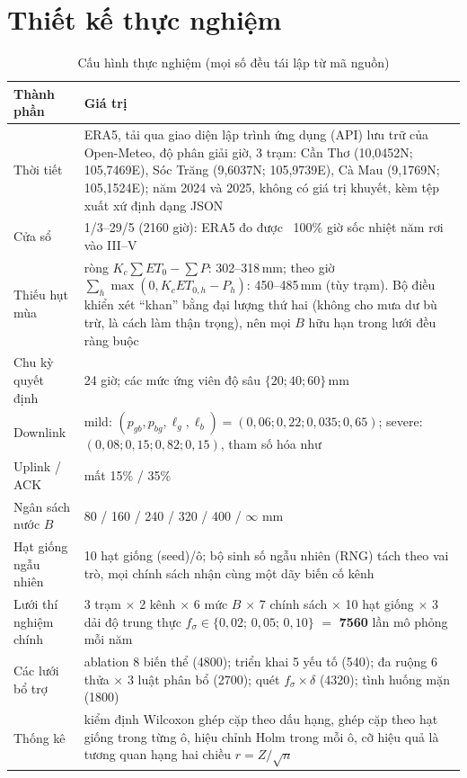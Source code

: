 \documentclass[10pt]{article}
\begin{document}
\section{Thiết kế thực nghiệm}

\begin{table}[h]
\centering
\caption{Cấu hình thực nghiệm (mọi số đều tái lập từ mã nguồn)}
\label{tab:setup}
\footnotesize
\begin{tabular}{@{}p{2.9cm}p{11.5cm}@{}}
\toprule
Thành phần & Giá trị \\
\midrule
Thời tiết & ERA5, tải qua giao diện lập trình ứng dụng (API) lưu trữ của Open-Meteo, độ phân giải giờ, 3 trạm: Cần Thơ (10,0452N; 105,7469E), Sóc Trăng (9,6037N; 105,9739E), Cà Mau (9,1769N; 105,1524E); năm 2024 và 2025, không có giá trị khuyết, kèm tệp xuất xứ định dạng JSON \\
Cửa sổ & 1/3--29/5 (2160 giờ): ERA5 đo được ~100\% giờ sốc nhiệt năm rơi vào III--V \\
Thiếu hụt mùa & ròng $K_c\sum ET_0-\sum P$: 302--318\,mm; theo giờ $\sum_h\max(0,K_cET_{0,h}-P_h)$: 450--485\,mm (tùy trạm). Bộ điều khiển xét ``khan'' bằng đại lượng thứ hai (không cho mưa dư bù trừ, là cách làm thận trọng), nên mọi $B$ hữu hạn trong lưới đều ràng buộc \\
Chu kỳ quyết định & 24 giờ; các mức ứng viên độ sâu $\{20;40;60\}$\,mm \\
Downlink & mild: $(p_{gb},p_{bg},\ell_g,\ell_b)=(0{,}06;0{,}22;0{,}035;0{,}65)$; severe: $(0{,}08;0{,}15;0{,}82;0{,}15)$, tham số hóa như~\cite{rabs,cawvou} \\
Uplink / ACK & mất 15\% / 35\% \\
Ngân sách nước $B$ & 80 / 160 / 240 / 320 / 400 / $\infty$ mm \\
Hạt giống ngẫu nhiên & 10 hạt giống (seed)/ô; bộ sinh số ngẫu nhiên (RNG) tách theo vai trò, mọi chính sách nhận cùng một dãy biến cố kênh \\
Lưới thí nghiệm chính & 3 trạm $\times$ 2 kênh $\times$ 6 mức $B$ $\times$ 7 chính sách $\times$ 10 hạt giống $\times$ 3 dải độ trung thực $f_\sigma\in\{0{,}02;\,0{,}05;\,0{,}10\}$ $=$ \textbf{7560} lần mô phỏng mỗi năm \\
Các lưới bổ trợ & ablation 8 biến thể (4800); triển khai 5 yếu tố (540); đa ruộng 6 thửa $\times$ 3 luật phân bổ (2700); quét $f_\sigma\times\delta$ (4320); tình huống mặn (1800) \\
Thống kê & kiểm định Wilcoxon ghép cặp theo dấu hạng, ghép cặp theo hạt giống trong từng ô, hiệu chỉnh Holm trong mỗi ô, cỡ hiệu quả là tương quan hạng hai chiều $r=Z/\sqrt{n}$ \\
\bottomrule
\end{tabular}
\end{table}
\end{document}
